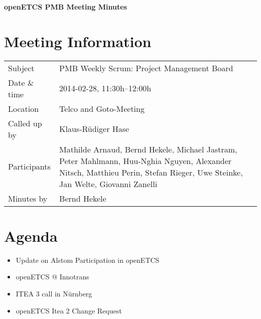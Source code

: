 \documentclass[a4paper, 11pt]{article}
\begin{document}
{\begin{center}\huge\bf openETCS PMB Meeting Minutes\end{center}}
\section{Meeting Information}

\renewcommand{\arraystretch}{1.5}
\begin{supertabular}{m{.2\textwidth}m{.8\textwidth}}
Subject & PMB Weekly Scrum: Project Management Board\\
Date \& time & 2014-02-28, 11:30h--12:00h\\
Location & Telco and Goto-Meeting\\
Called up by & Klaus-R\"udiger Hase\\
Participants &
Mathilde Arnaud,
Bernd Hekele,
Michael Jastram,
Peter Mahlmann,
Huu-Nghia Nguyen,
Alexander Nitsch,
Matthieu Perin,
Stefan Rieger,
Uwe Steinke,
Jan Welte,
Giovanni Zanelli
\\

Minutes by & Bernd Hekele\\

\end{supertabular}
\renewcommand{\arraystretch}{1.0}


\section{{Agenda}}

\begin{itemize}

\item Update on Alstom Participation in openETCS
\item openETCS @ Innotrans
\item ITEA 3 call in N\"urnberg
\item openETCS Itea 2 Change Request
\end{itemize}
\end{document}
